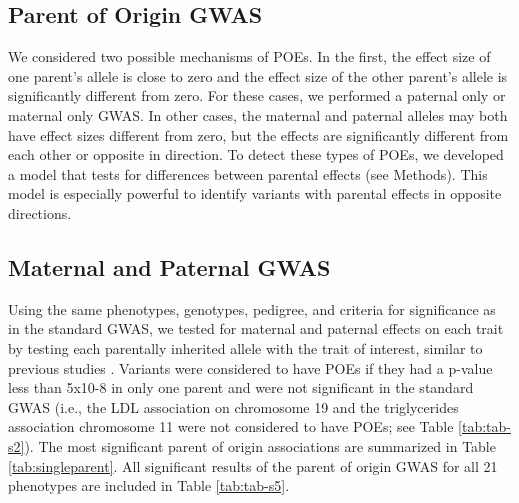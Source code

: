 \subsection{Parent of Origin GWAS}\label{Parent of Origin GWAS}
We considered two possible mechanisms of POEs. In the first, the effect size of one parent's allele is close to zero and the effect size of the other parent's allele is significantly different from zero. For these cases, we performed a paternal only or maternal only GWAS. In other cases, the maternal and paternal alleles may both have effect sizes different from zero, but the effects are significantly different from each other or opposite in direction. To detect these types of POEs, we developed a model that tests for differences between parental effects (see Methods). This model is especially powerful to identify variants with parental effects in opposite directions.

\subsection{Maternal and Paternal GWAS}\label{Maternal and Paternal GWAS}
Using the same phenotypes, genotypes, pedigree, and criteria for significance as in the standard GWAS, we tested for maternal and paternal effects on each trait by testing each parentally inherited allele with the trait of interest, similar to previous studies \citep{Kong:2009kk,Zoledziewska:2015do,Garg2012a}. Variants were considered to have POEs if they had a p-value less than 5x10-8 in only one parent and were not significant in the standard GWAS (i.e., the LDL association on chromosome 19 and the triglycerides association chromosome 11 were not considered to have POEs; see Table \ref{tab:tab-s2}). The most significant parent of origin associations are summarized in Table \ref{tab:singleparent}. All significant results of the parent of origin GWAS for all 21 phenotypes are included in Table \ref{tab:tab-s5}. 


